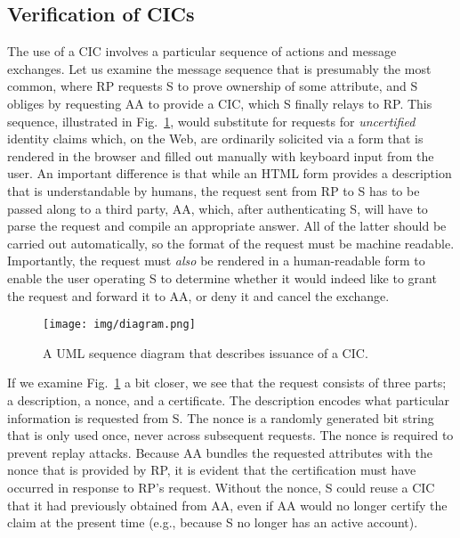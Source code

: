 \documentclass[conference]{IEEEtran}
\begin{document}
\subsection{Verification of CICs}
The use of a CIC involves a particular sequence of actions and message exchanges. 
Let us examine the message sequence that is presumably the most common, where {\sf RP} requests {\sf S} to prove ownership of some attribute, and {\sf S} obliges by requesting {\sf AA} to provide a CIC, which {\sf S} finally relays to {\sf RP}. This sequence, illustrated in Fig.~\ref{fig:sequence}, would substitute for requests for \emph{uncertified} identity claims which, on the Web, are ordinarily solicited via a form that is rendered in the browser and filled out manually with keyboard input from the user. An important difference is that while an HTML form provides a description that is understandable by humans, the request sent from {\sf RP} to {\sf S} has to be passed along to a third party, {\sf AA}, which, after authenticating {\sf S}, will have to parse the request and compile an appropriate answer. All of the latter should be carried out automatically, so the format of the request must be machine readable. Importantly, the request must \emph{also} be rendered in a human-readable form to enable the user operating {\sf S} to determine whether it would indeed like to grant the request and forward it to {\sf AA}, or deny it and cancel the exchange.

\begin{figure}[ht]
    \centering
  \texttt{[image: img/diagram.png]}
  \caption{A UML sequence diagram that describes issuance of a CIC.}
  \label{fig:sequence}
\end{figure}

If we examine Fig.~\ref{fig:sequence} a bit closer, we see that the request consists of three parts; a description, a nonce, and a certificate. The description encodes what particular information is requested from {\sf S}.
The nonce is a randomly generated bit string that is only used once, never across subsequent requests. The nonce is required to prevent replay attacks. Because {\sf AA} bundles the requested attributes with the nonce that is provided by {\sf RP}, it is evident that the certification must have occurred in response to {\sf RP}'s request. Without the nonce, {\sf S} could reuse a CIC that it had previously obtained from {\sf AA}, even if {\sf AA} would no longer certify the claim at the present time (e.g., because {\sf S} no longer has an active account).
\end{document}
